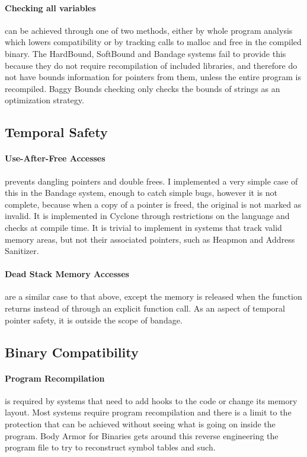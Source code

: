 \paragraph{Checking all variables} can be achieved through one of two methods, either by whole program analysis which lowers compatibility or by tracking calls to malloc and free in the compiled binary.
The HardBound, SoftBound and Bandage systems fail to provide this because they do not require recompilation of included libraries, and therefore do not have bounds information for pointers from them, unless the entire program is recompiled.
Baggy Bounds checking only checks the bounds of strings as an optimization strategy.

\subsection{Temporal Safety}

\paragraph{Use-After-Free Accesses} prevents dangling pointers and double frees.
I implemented a very simple case of this in the Bandage system, enough to catch simple bugs, however it is not complete, because when a copy of a pointer is freed, the original is not marked as invalid.
It is implemented in Cyclone through restrictions on the language and checks at compile time.
It is trivial to implement in systems that track valid memory areas, but not their associated pointers, such as Heapmon and Address Sanitizer.

\paragraph{Dead Stack Memory Accesses} are a similar case to that above, except the memory is released when the function returns instead of through an explicit function call.
As an aspect of temporal pointer safety, it is outside the scope of bandage.

\subsection{Binary Compatibility}

\paragraph{Program Recompilation} is required by systems that need to add hooks to the code or change its memory layout.
Most systems require program recompilation and there is a limit to the protection that can be achieved without seeing what is going on inside the program.
Body Armor for Binaries gets around this reverse engineering the program file to try to reconstruct symbol tables and such.

